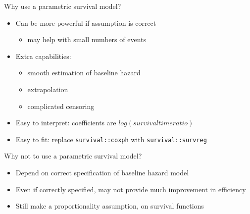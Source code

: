 \documentclass[
  ignorenonframetext,
]{beamer}
\providecommand{\tightlist}{%
  \setlength{\itemsep}{0pt}\setlength{\parskip}{0pt}}
\begin{document}
\begin{frame}[fragile]{Why use a parametric survival model?}
\protect\hypertarget{why-use-a-parametric-survival-model}{}

\begin{itemize}
\tightlist
\item
  Can be more powerful if assumption is correct

  \begin{itemize}
  \tightlist
  \item
    may help with small numbers of events
  \end{itemize}
\item
  Extra capabilities:

  \begin{itemize}
  \tightlist
  \item
    smooth estimation of baseline hazard
  \item
    extrapolation
  \item
    complicated censoring
  \end{itemize}
\item
  Easy to interpret: coefficients are \(log(survival time ratio)\)
\item
  Easy to fit: replace \texttt{survival::coxph} with
  \texttt{survival::survreg}
\end{itemize}

\end{frame}

\begin{frame}{Why not to use a parametric survival model?}
\protect\hypertarget{why-not-to-use-a-parametric-survival-model}{}

\begin{itemize}
\tightlist
\item
  Depend on correct specification of baseline hazard model
\item
  Even if correctly specified, may not provide much improvement in
  efficiency
\item
  Still make a proportionality assumption, on survival functions
\end{itemize}

\end{frame}
\end{document}
